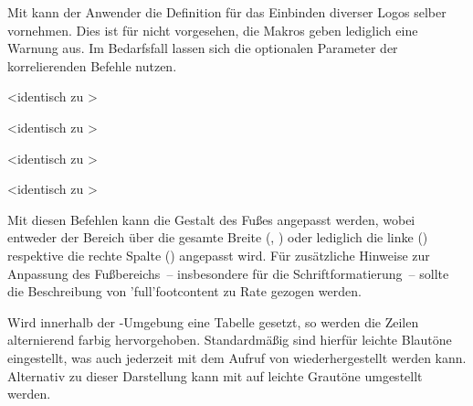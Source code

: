 \begin{DeclareEntity}{}
\begin{Declaration}
\begin{Declaration}
\begin{Declaration}
Mit  kann der Anwender die Definition für das Einbinden 
diverser Logos selber vornehmen. Dies ist für \TUDScript nicht vorgesehen, 
die Makros geben lediglich eine Warnung aus. Im Bedarfsfall lassen sich die 
optionalen Parameter der korrelierenden Befehle nutzen. 
\end{Declaration}
\end{Declaration}
\end{Declaration}

\begin{Declaration}
  {}
  <identisch zu >
\begin{Declaration}
  {}
  <identisch zu >
\begin{Declaration}
  {}
  <identisch zu >
\begin{Declaration}
  {}
  <identisch zu >
\printdeclarationlist

Mit diesen Befehlen kann die Gestalt des Fußes angepasst werden, wobei entweder 
der Bereich über die gesamte Breite (, ) 
oder lediglich die linke () respektive die rechte Spalte 
() angepasst wird. Für zusätzliche Hinweise zur Anpassung 
des Fußbereichs~-- insbesondere für die Schriftformatierung~-- sollte die 
Beschreibung von \Macro*'full'{footcontent} zu Rate gezogen werden.
\end{Declaration}
\end{Declaration}
\end{Declaration}
\end{Declaration}

\begin{Declaration}
  {}
\begin{Declaration}
  {}
\begin{Declaration}
  {}
\printdeclarationlist

Wird innerhalb der -Umgebung eine Tabelle gesetzt, 
so werden die Zeilen alternierend farbig hervorgehoben. Standardmäßig sind 
hierfür leichte Blautöne eingestellt, was auch jederzeit mit dem Aufruf von 
 wiederhergestellt werden kann. Alternativ zu dieser 
Darstellung kann mit  auf leichte Grautöne umgestellt werden.
\end{Declaration}
\end{Declaration}
\end{Declaration}


\end{DeclareEntity}

